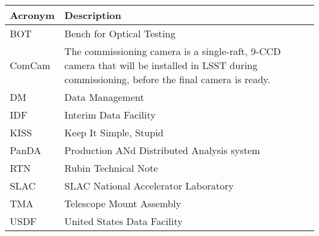 \addtocounter{table}{-1}
\begin{longtable}{p{}p{}}\hline
\textbf{Acronym} & \textbf{Description}  \\\hline

BOT & Bench for Optical Testing \\\hline
ComCam & The commissioning camera is a single-raft, 9-CCD camera that will be installed in LSST during commissioning, before the final camera is ready. \\\hline
DM & Data Management \\\hline
IDF & Interim Data Facility \\\hline
KISS & Keep It Simple, Stupid \\\hline
PanDA &  Production ANd Distributed Analysis system \\\hline
RTN & Rubin Technical Note \\\hline
SLAC & SLAC National Accelerator Laboratory \\\hline
TMA & Telescope Mount Assembly \\\hline
USDF & United States Data Facility \\\hline
\end{longtable}
